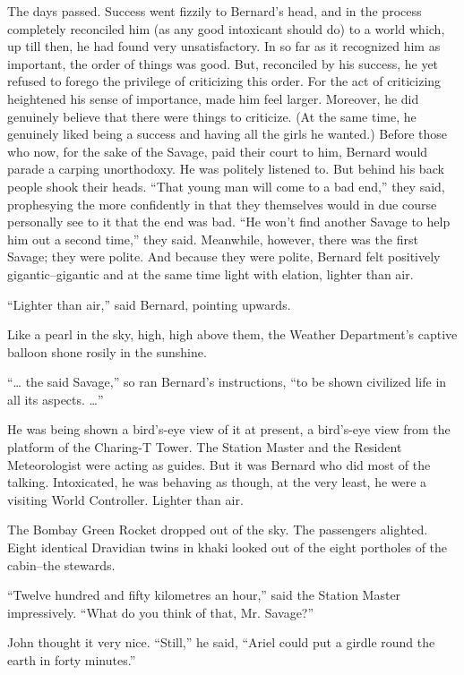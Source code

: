 \documentclass[12pt]{report}
\begin{document}
The days passed. Success went fizzily to Bernard's head, and in the
process completely reconciled him (as any good intoxicant should do) to
a world which, up till then, he had found very unsatisfactory. In so far
as it recognized him as important, the order of things was good. But,
reconciled by his success, he yet refused to forego the privilege of
criticizing this order. For the act of criticizing heightened his sense
of importance, made him feel larger. Moreover, he did genuinely believe
that there were things to criticize. (At the same time, he genuinely
liked being a success and having all the girls he wanted.) Before those
who now, for the sake of the Savage, paid their court to him, Bernard
would parade a carping unorthodoxy. He was politely listened to. But
behind his back people shook their heads. ``That young man will come to
a bad end,'' they said, prophesying the more confidently in that they
themselves would in due course personally see to it that the end was
bad. ``He won't find another Savage to help him out a second time,''
they said. Meanwhile, however, there was the first Savage; they were
polite. And because they were polite, Bernard felt positively
gigantic--gigantic and at the same time light with elation, lighter than
air.

``Lighter than air,'' said Bernard, pointing upwards.

Like a pearl in the sky, high, high above them, the Weather Department's
captive balloon shone rosily in the sunshine.

``\ldots{} the said Savage,'' so ran Bernard's instructions, ``to be
shown civilized life in all its aspects. \ldots{}''

He was being shown a bird's-eye view of it at present, a bird's-eye view
from the platform of the Charing-T Tower. The Station Master and the
Resident Meteorologist were acting as guides. But it was Bernard who did
most of the talking. Intoxicated, he was behaving as though, at the very
least, he were a visiting World Controller. Lighter than air.

The Bombay Green Rocket dropped out of the sky. The passengers alighted.
Eight identical Dravidian twins in khaki looked out of the eight
portholes of the cabin--the stewards.

``Twelve hundred and fifty kilometres an hour,'' said the Station Master
impressively. ``What do you think of that, Mr. Savage?''

John thought it very nice. ``Still,'' he said, ``Ariel could put a
girdle round the earth in forty minutes.''
\end{document}
